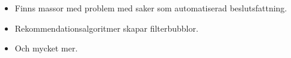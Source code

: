 \begin{frame}
  \begin{remark}
    \begin{itemize}
      \item Finns massor med problem med saker som automatiserad 
        beslutsfattning.
      \item Rekommendationsalgoritmer skapar filterbubblor.
      \item Och mycket mer.
    \end{itemize}
  \end{remark}
\end{frame}









